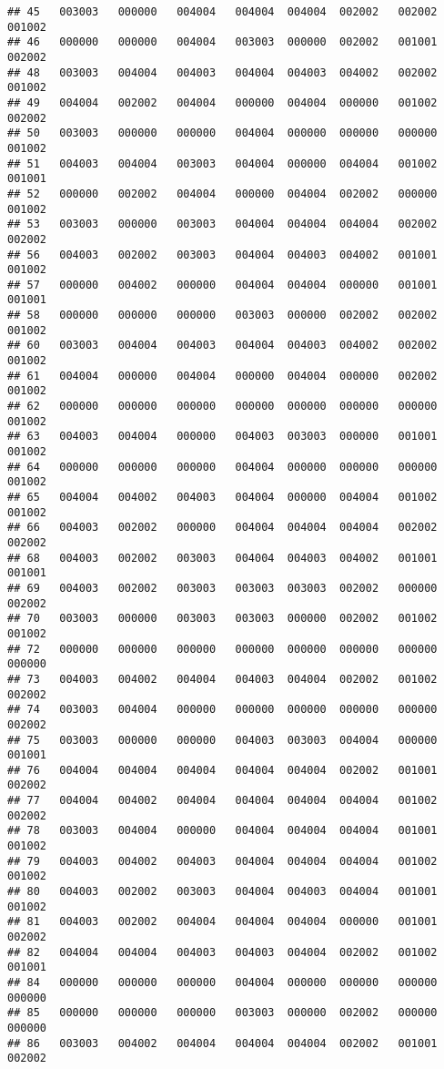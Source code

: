 \documentclass[
]{article}
\begin{document}
\begin{verbatim}
## 45   003003   000000   004004   004004  004004  002002   002002   001002
## 46   000000   000000   004004   003003  000000  002002   001001   002002
## 48   003003   004004   004003   004004  004003  004002   002002   001002
## 49   004004   002002   004004   000000  004004  000000   001002   002002
## 50   003003   000000   000000   004004  000000  000000   000000   001002
## 51   004003   004004   003003   004004  000000  004004   001002   001001
## 52   000000   002002   004004   000000  004004  002002   000000   001002
## 53   003003   000000   003003   004004  004004  004004   002002   002002
## 56   004003   002002   003003   004004  004003  004002   001001   001002
## 57   000000   004002   000000   004004  004004  000000   001001   001001
## 58   000000   000000   000000   003003  000000  002002   002002   001002
## 60   003003   004004   004003   004004  004003  004002   002002   001002
## 61   004004   000000   004004   000000  004004  000000   002002   001002
## 62   000000   000000   000000   000000  000000  000000   000000   001002
## 63   004003   004004   000000   004003  003003  000000   001001   001002
## 64   000000   000000   000000   004004  000000  000000   000000   001002
## 65   004004   004002   004003   004004  000000  004004   001002   001002
## 66   004003   002002   000000   004004  004004  004004   002002   002002
## 68   004003   002002   003003   004004  004003  004002   001001   001001
## 69   004003   002002   003003   003003  003003  002002   000000   002002
## 70   003003   000000   003003   003003  000000  002002   001002   001002
## 72   000000   000000   000000   000000  000000  000000   000000   000000
## 73   004003   004002   004004   004003  004004  002002   001002   002002
## 74   003003   004004   000000   000000  000000  000000   000000   002002
## 75   003003   000000   000000   004003  003003  004004   000000   001001
## 76   004004   004004   004004   004004  004004  002002   001001   002002
## 77   004004   004002   004004   004004  004004  004004   001002   002002
## 78   003003   004004   000000   004004  004004  004004   001001   001002
## 79   004003   004002   004003   004004  004004  004004   001002   001002
## 80   004003   002002   003003   004004  004003  004004   001001   001002
## 81   004003   002002   004004   004004  004004  000000   001001   002002
## 82   004004   004004   004003   004003  004004  002002   001002   001001
## 84   000000   000000   000000   004004  000000  000000   000000   000000
## 85   000000   000000   000000   003003  000000  002002   000000   000000
## 86   003003   004002   004004   004004  004004  002002   001001   002002

\end{verbatim}
\end{document}
